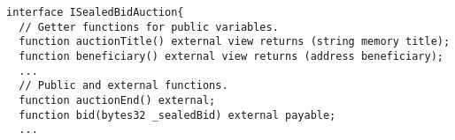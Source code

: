 \begin{lstlisting}[language=Solidity]
interface ISealedBidAuction{
  // Getter functions for public variables.
  function auctionTitle() external view returns (string memory title);
  function beneficiary() external view returns (address beneficiary); 
  ...
  // Public and external functions.
  function auctionEnd() external;
  function bid(bytes32 _sealedBid) external payable;
  ...
\end{lstlisting}